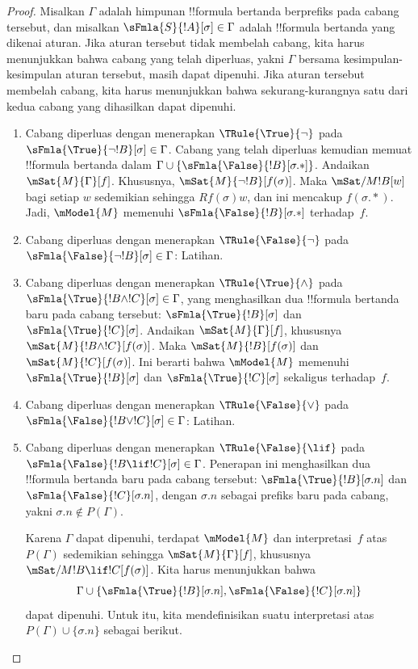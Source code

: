 \documentclass[../../../include/open-logic-section]{subfiles}
\begin{document}
\begin{proof}
Misalkan $\Gamma$ adalah himpunan !!{formula} bertanda berprefiks pada cabang
tersebut, dan misalkan $\sFmla{S}{!A}[\sigma] \in \Gamma$ adalah
!!{formula} bertanda yang dikenai aturan. Jika aturan tersebut tidak
membelah cabang, kita harus menunjukkan bahwa cabang yang telah diperluas,
yakni $\Gamma$ bersama kesimpulan-kesimpulan aturan tersebut, masih dapat
dipenuhi. Jika aturan tersebut membelah cabang, kita harus menunjukkan bahwa
sekurang-kurangnya satu dari kedua cabang yang dihasilkan dapat dipenuhi.
\begin{enumerate}
\item Cabang diperluas dengan menerapkan $\TRule{\True}{\lnot}$ pada
  $\sFmla{\True}{\lnot !B}[\sigma] \in \Gamma$. Cabang yang telah
  diperluas kemudian memuat !!{formula} bertanda dalam $\Gamma \cup
  \{\sFmla{\False}{!B}[\sigma.{*}]\}$. Andaikan
  $\mSat{M}{\Gamma}[f]$. Khususnya,
  $\mSat{M}{\lnot !B}[f(\sigma)]$. Maka
  $\mSat/{M}{!B}[w]$ bagi setiap $w$ sedemikian sehingga $Rf(\sigma)w$,
  dan ini mencakup $f(\sigma.{*})$. Jadi, $\mModel{M}$ memenuhi
  $\sFmla{\False}{!B}[\sigma.{*}]$ terhadap~$f$.
\item Cabang diperluas dengan menerapkan $\TRule{\False}{\lnot}$ pada
  $\sFmla{\False}{\lnot !B}[\sigma] \in \Gamma$: Latihan.
\item Cabang diperluas dengan menerapkan $\TRule{\True}{\land}$ pada
  $\sFmla{\True}{!B \land !C}[\sigma] \in \Gamma$, yang menghasilkan dua
  !!{formula} bertanda baru pada cabang tersebut:
  $\sFmla{\True}{!B}[\sigma]$ dan $\sFmla{\True}{!C}[\sigma]$. Andaikan
  $\mSat{M}{\Gamma}[f]$, khususnya
  $\mSat{M}{!B \land !C}[f(\sigma)]$. Maka
  $\mSat{M}{!B}[f(\sigma)]$ dan $\mSat{M}{!C}[f(\sigma)]$. Ini berarti
  bahwa $\mModel{M}$ memenuhi $\sFmla{\True}{!B}[\sigma]$ dan
  $\sFmla{\True}{!C}[\sigma]$ sekaligus terhadap~$f$.
\item Cabang diperluas dengan menerapkan $\TRule{\False}{\lor}$ pada
  $\sFmla{\False}{!B \lor !C}[\sigma] \in \Gamma$: Latihan.
\item Cabang diperluas dengan menerapkan $\TRule{\False}{\lif}$ pada
  $\sFmla{\False}{!B \lif !C}[\sigma] \in \Gamma$. Penerapan ini
  menghasilkan dua !!{formula} bertanda baru pada cabang tersebut:
  $\sFmla{\True}{!B}[\sigma.n]$ dan
  $\sFmla{\False}{!C}[\sigma.n]$, dengan $\sigma.n$ sebagai prefiks baru
  pada cabang, yakni $\sigma.n \notin P(\Gamma)$.

  Karena $\Gamma$ dapat dipenuhi, terdapat $\mModel{M}$ dan
  interpretasi~$f$ atas $P(\Gamma)$ sedemikian sehingga
  $\mSat{M}{\Gamma}[f]$, khususnya
  $\mSat/{M}{!B \lif !C}[f(\sigma)]$. Kita harus menunjukkan bahwa
  \[
  \Gamma \cup \{\sFmla{\True}{!B}[\sigma.n],
                  \sFmla{\False}{!C}[\sigma.n]\}
  \]
  dapat dipenuhi. Untuk itu, kita mendefinisikan suatu interpretasi atas
  $P(\Gamma) \cup \{\sigma.n\}$ sebagai berikut.


\end{enumerate}
\end{proof}
\end{document}
